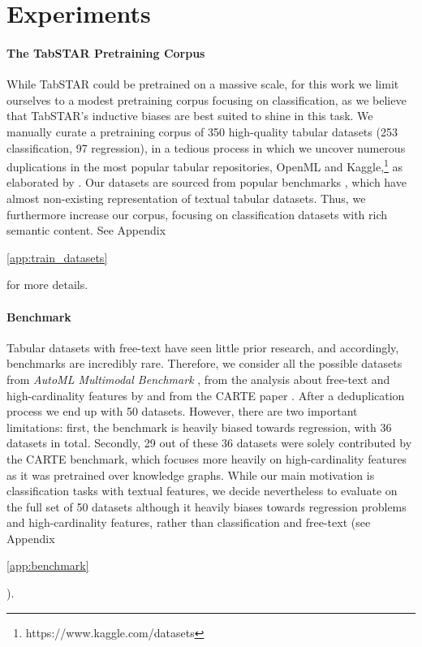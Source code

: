 \documentclass{article}
\newif\ifappendicesincluded
\newcommand{\appref}[1]{%
  \ifappendicesincluded
    \ref{#1}%
  \else
    \ref*{#1}%
  \fi
}
\begin{document}
\section{Experiments}
\label{sec:main_experiments}

\paragraph{The TabSTAR Pretraining Corpus}\label{sec:exp:corpus}  While TabSTAR could be pretrained on a massive scale, for this work we limit ourselves to a modest pretraining corpus focusing on classification, as we believe that TabSTAR's inductive biases are best suited to shine in this task. We manually curate a pretraining corpus of 350 high-quality tabular datasets (253 classification, 97 regression), in a tedious process in which we uncover numerous duplications in the most popular tabular repositories, OpenML \cite{vanschoren_openml_2014} and Kaggle,\footnote{https://www.kaggle.com/datasets} as elaborated by \cite{tschalzev_unreflected_2025}. Our datasets are sourced from popular benchmarks \cite{gijsbers_amlb_2024, kim_carte_2024, fischer_openml-ctr23_2023, feurer_auto-sklearn_2022, grinsztajn_why_2022, shi_benchmarking_2021, mcelfresh_when_2023, grinsztajn_vectorizing_2023}, which have almost non-existing representation of textual tabular datasets. Thus, we furthermore increase our corpus, focusing on classification datasets with rich semantic content. See Appendix~\appref{app:train_datasets} for more details.

\paragraph{Benchmark} \label{sec:exp:benchmark} 
Tabular datasets with free-text have seen little prior research, and accordingly, benchmarks are incredibly rare. Therefore, we consider all the possible datasets from \textit{AutoML Multimodal Benchmark} \cite{shi_benchmarking_2021}, from the analysis about free-text and high-cardinality features by \cite{grinsztajn_vectorizing_2023} and from the CARTE paper \cite{kim_carte_2024}. After a deduplication process we end up with 50 datasets. However, there are two important limitations: first, the benchmark is heavily biased towards regression, with 36 datasets in total. Secondly, 29 out of these 36 datasets were solely contributed by the CARTE benchmark, which focuses more heavily on high-cardinality features as it was pretrained over knowledge graphs. While our main motivation is classification tasks with textual features, we decide nevertheless to evaluate on the full set of 50 datasets although it heavily biases towards regression problems and high-cardinality features, rather than classification and free-text (see Appendix~\appref{app:benchmark}).
\end{document}
